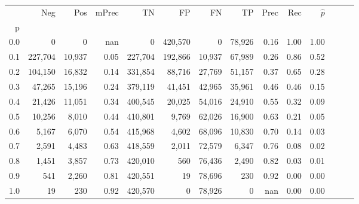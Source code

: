 \begin{tabular}{rrrrrrrrrrrrrr}
\toprule
{} &      Neg &     Pos & mPrec &       TN &       FP &      FN &      TP &  Prec &   Rec & $\hat{p}$ \\
p   &          &         &       &          &          &         &         &       &       &           \\
\midrule
0.0 &        0 &       0 &   nan &        0 &  420,570 &       0 &  78,926 &  0.16 &  1.00 &      1.00 \\
0.1 &  227,704 &  10,937 &  0.05 &  227,704 &  192,866 &  10,937 &  67,989 &  0.26 &  0.86 &      0.52 \\
0.2 &  104,150 &  16,832 &  0.14 &  331,854 &   88,716 &  27,769 &  51,157 &  0.37 &  0.65 &      0.28 \\
0.3 &   47,265 &  15,196 &  0.24 &  379,119 &   41,451 &  42,965 &  35,961 &  0.46 &  0.46 &      0.15 \\
0.4 &   21,426 &  11,051 &  0.34 &  400,545 &   20,025 &  54,016 &  24,910 &  0.55 &  0.32 &      0.09 \\
0.5 &   10,256 &   8,010 &  0.44 &  410,801 &    9,769 &  62,026 &  16,900 &  0.63 &  0.21 &      0.05 \\
0.6 &    5,167 &   6,070 &  0.54 &  415,968 &    4,602 &  68,096 &  10,830 &  0.70 &  0.14 &      0.03 \\
0.7 &    2,591 &   4,483 &  0.63 &  418,559 &    2,011 &  72,579 &   6,347 &  0.76 &  0.08 &      0.02 \\
0.8 &    1,451 &   3,857 &  0.73 &  420,010 &      560 &  76,436 &   2,490 &  0.82 &  0.03 &      0.01 \\
0.9 &      541 &   2,260 &  0.81 &  420,551 &       19 &  78,696 &     230 &  0.92 &  0.00 &      0.00 \\
1.0 &       19 &     230 &  0.92 &  420,570 &        0 &  78,926 &       0 &   nan &  0.00 &      0.00 \\
\bottomrule
\end{tabular}
